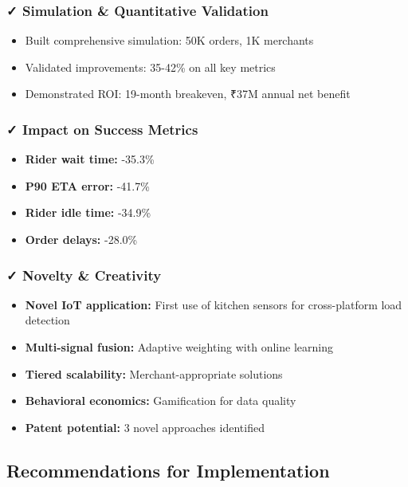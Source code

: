 \documentclass[11pt,a4paper]{article}
\begin{document}
\subsubsection{✓ Simulation \& Quantitative Validation}

\begin{itemize}[leftmargin=*]
    \item Built comprehensive simulation: 50K orders, 1K merchants
    \item Validated improvements: 35-42\% on all key metrics
    \item Demonstrated ROI: 19-month breakeven, ₹37M annual net benefit
\end{itemize}

\subsubsection{✓ Impact on Success Metrics}

\begin{itemize}[leftmargin=*]
    \item \textbf{Rider wait time:} -35.3\%
    \item \textbf{P90 ETA error:} -41.7\%
    \item \textbf{Rider idle time:} -34.9\%
    \item \textbf{Order delays:} -28.0\%
\end{itemize}

\subsubsection{✓ Novelty \& Creativity}

\begin{itemize}[leftmargin=*]
    \item \textbf{Novel IoT application:} First use of kitchen sensors for cross-platform load detection
    \item \textbf{Multi-signal fusion:} Adaptive weighting with online learning
    \item \textbf{Tiered scalability:} Merchant-appropriate solutions
    \item \textbf{Behavioral economics:} Gamification for data quality
    \item \textbf{Patent potential:} 3 novel approaches identified
\end{itemize}

\subsection{Recommendations for Implementation}
\end{document}
